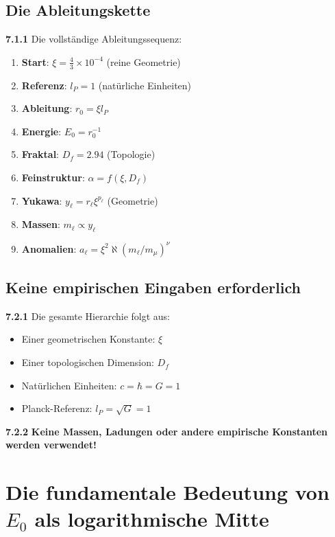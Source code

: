 \documentclass[12pt,a4paper]{article}
\newcommand{\lP}{l_P}
\newcommand{\rzero}{r_0}
\newcommand{\Ezero}{E_0}
\newcommand{\xipar}{\xi}
\begin{document}
\subsection{Die Ableitungskette}

\noindent \textbf{7.1.1} Die vollständige Ableitungssequenz:
\begin{enumerate}
	\item \textbf{Start}: $\xipar = \frac{4}{3} \times 10^{-4}$ (reine Geometrie)
	\item \textbf{Referenz}: $\lP = 1$ (natürliche Einheiten)
	\item \textbf{Ableitung}: $\rzero = \xipar \lP$
	\item \textbf{Energie}: $\Ezero = \rzero^{-1}$
	\item \textbf{Fraktal}: $D_f = 2.94$ (Topologie)
	\item \textbf{Feinstruktur}: $\alpha = f(\xipar, D_f)$
	\item \textbf{Yukawa}: $y_\ell = r_\ell \xipar^{p_\ell}$ (Geometrie)
	\item \textbf{Massen}: $m_\ell \propto y_\ell$
	\item \textbf{Anomalien}: $a_\ell = \xipar^2 \aleph (m_\ell/m_\mu)^\nu$
\end{enumerate}

\subsection{Keine empirischen Eingaben erforderlich}

\noindent \textbf{7.2.1} Die gesamte Hierarchie folgt aus:
\begin{itemize}
	\item Einer geometrischen Konstante: $\xipar$
	\item Einer topologischen Dimension: $D_f$
	\item Natürlichen Einheiten: $c = \hbar = G = 1$
	\item Planck-Referenz: $\lP = \sqrt{G} = 1$
\end{itemize}

\noindent \textbf{7.2.2} \textbf{Keine Massen, Ladungen oder andere empirische Konstanten werden verwendet!}

\section{Die fundamentale Bedeutung von $\Ezero$ als logarithmische Mitte}
\end{document}
